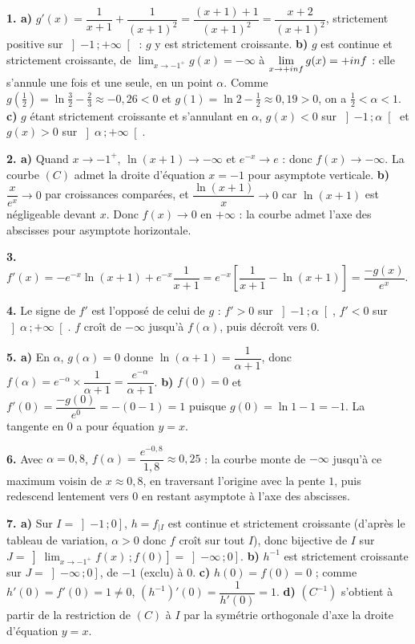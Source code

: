\begin{corrige}
\textbf{1. a)} $g'(x) = \dfrac{1}{x+1} + \dfrac{1}{(x+1)^{2}}
= \dfrac{(x+1)+1}{(x+1)^{2}} = \dfrac{x+2}{(x+1)^{2}}$, strictement positive
sur $\left]-1\,;+\infty\right[$ : $g$ y est strictement croissante.
\textbf{b)} $g$ est continue et strictement croissante, de
$\lim_{x\to-1^{+}}g(x) = -\infty$ à $\limpinf g(x) = +\infty$ : elle
s'annule une fois et une seule, en un point $\alpha$. Comme
$g\!\left(\frac12\right) = \ln\frac32-\frac23 \approx -0{,}26<0$ et
$g(1) = \ln2-\frac12 \approx 0{,}19>0$, on a $\frac12 < \alpha < 1$.
\textbf{c)} $g$ étant strictement croissante et s'annulant en $\alpha$,
$g(x)<0$ sur $\left]-1\,;\alpha\right[$ et $g(x)>0$ sur
$\left]\alpha\,;+\infty\right[$.

\textbf{2. a)} Quand $x\to-1^{+}$, $\ln(x+1)\to-\infty$ et $e^{-x}\to e$ :
donc $f(x)\to-\infty$. La courbe $(C)$ admet la droite d'équation $x=-1$
pour asymptote verticale.
\textbf{b)} $\dfrac{x}{e^{x}}\to0$ par croissances comparées, et
$\dfrac{\ln(x+1)}{x}\to0$ car $\ln(x+1)$ est négligeable devant $x$. Donc
$f(x)\to0$ en $+\infty$ : la courbe admet l'axe des abscisses pour asymptote
horizontale.

\textbf{3.} $f'(x) = -e^{-x}\ln(x+1)+e^{-x}\dfrac{1}{x+1}
= e^{-x}\left[\dfrac{1}{x+1}-\ln(x+1)\right] = \dfrac{-g(x)}{e^{x}}$.

\textbf{4.} Le signe de $f'$ est l'opposé de celui de $g$ : $f'>0$ sur
$\left]-1\,;\alpha\right[$, $f'<0$ sur $\left]\alpha\,;+\infty\right[$. $f$
croît de $-\infty$ jusqu'à $f(\alpha)$, puis décroît vers $0$.

\textbf{5. a)} En $\alpha$, $g(\alpha)=0$ donne
$\ln(\alpha+1) = \dfrac{1}{\alpha+1}$, donc
$f(\alpha) = e^{-\alpha}\times\dfrac{1}{\alpha+1} = \dfrac{e^{-\alpha}}{\alpha+1}$.
\textbf{b)} $f(0) = 0$ et $f'(0) = \dfrac{-g(0)}{e^{0}} = -(0-1) = 1$
puisque $g(0) = \ln1-1 = -1$. La tangente en $0$ a pour équation $y = x$.

\textbf{6.} Avec $\alpha = 0{,}8$, $f(\alpha) = \dfrac{e^{-0{,}8}}{1{,}8}
\approx 0{,}25$ : la courbe monte de $-\infty$ jusqu'à ce maximum voisin de
$x\approx0{,}8$, en traversant l'origine avec la pente $1$, puis redescend
lentement vers $0$ en restant asymptote à l'axe des abscisses.

\textbf{7. a)} Sur $I = \left]-1\,;0\right]$, $h = f_{|I}$ est continue et
strictement croissante (d'après le tableau de variation, $\alpha>0$ donc $f$
croît sur tout $I$), donc bijective de $I$ sur
$J = \left]\lim_{x\to-1^{+}}f(x)\,;f(0)\right] = \left]-\infty\,;0\right]$.
\textbf{b)} $h^{-1}$ est strictement croissante sur $J = \left]-\infty\,;0\right]$,
de $-1$ (exclu) à $0$.
\textbf{c)} $h(0) = f(0) = 0$ ; comme $h'(0) = f'(0) = 1 \neq 0$,
$\left(h^{-1}\right)'(0) = \dfrac{1}{h'(0)} = 1$.
\textbf{d)} $(C^{-1})$ s'obtient à partir de la restriction de $(C)$ à $I$ par
la symétrie orthogonale d'axe la droite d'équation $y=x$.


\end{corrige}
